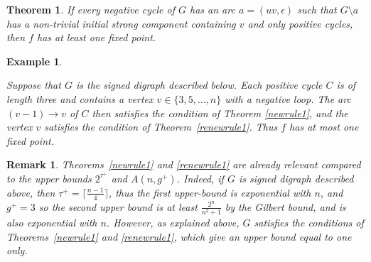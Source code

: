 \documentclass[11pt,a4paper]{article}
\newtheorem{remark}{Remark}
\newtheorem{theorem}{Theorem}
\newtheorem{example}{Example}
\begin{document}
\begin{theorem}\label{newrule2}
If every negative cycle of $G$ has an arc $a=(uv,\epsilon)$ such that $G\setminus a$ has a non-trivial initial strong component containing $v$ and only positive cycles, then $f$ has at least one fixed point.
\end{theorem}

\begin{example}\label{ex1}
{\em Suppose that $G$ is the signed digraph described below. Each positive cycle $C$ is of length three and contains a vertex $v\in\{3,5,\dots,n\}$ with a negative loop. The arc $(v-1)\to v$ of $C$ then satisfies the condition of Theorem \ref{newrule1}, and the vertex $v$ satisfies the condition of Theorem~\ref{renewrule1}. Thus $f$ has at most one fixed point.
\begin{center}
\end{center}}
\end{example}

\begin{remark}\label{rem:upperbound}
{\em Theorems~\ref{newrule1} and \ref{renewrule1} are already relevant compared to the upper bounds $2^{\tau^+}$ and $A(n,g^+)$. Indeed, if $G$ is signed digraph described above,  then $\tau^+=\lceil\frac{n-1}{4}\rceil$, thus the first upper-bound is exponential with $n$, and $g^+=3$ so the second upper bound is at least $\frac{2^{n}}{n^2+1}$ by the Gilbert bound, and is also exponential with $n$. However, as explained above, $G$ satisfies the conditions of Theorems~\ref{newrule1} and \ref{renewrule1}, which give an upper bound equal to one only.}
\end{remark}
\end{document}
